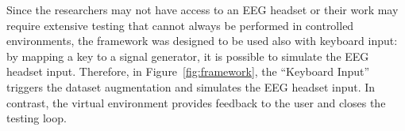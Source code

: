Since the researchers may not have access to an EEG headset or their work may require extensive testing that cannot always be performed in controlled environments, the framework was designed to be used also with keyboard input: by mapping a key to a signal generator, it is possible to simulate the EEG headset input.
Therefore, in Figure~\ref{fig:framework}, the ``Keyboard Input'' triggers the dataset augmentation and simulates the EEG headset input. In contrast, the virtual environment provides feedback to the user and closes the testing loop.